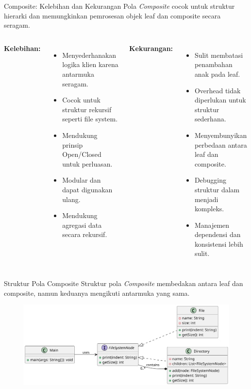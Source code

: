 \documentclass[aspectratio=169, table]{beamer}
\begin{document}
\begin{frame}[fragile]{Composite: Kelebihan dan Kekurangan}
	\vspace{15pt}
	Pola \textit{Composite} cocok untuk struktur hierarki dan memungkinkan pemrosesan objek leaf dan composite secara seragam.
	
	\begin{columns}[T]
		\textbf{Kelebihan:}
		\begin{itemize}
			\item Menyederhanakan logika klien karena antarmuka seragam.
			\item Cocok untuk struktur rekursif seperti file system.
			\item Mendukung prinsip Open/Closed untuk perluasan.
			\item Modular dan dapat digunakan ulang.
			\item Mendukung agregasi data secara rekursif.
		\end{itemize}
		
		\textbf{Kekurangan:}
		\begin{itemize}
			\item Sulit membatasi penambahan anak pada leaf.
			\item Overhead tidak diperlukan untuk struktur sederhana.
			\item Menyembunyikan perbedaan antara leaf dan composite.
			\item Debugging struktur dalam menjadi kompleks.
			\item Manajemen dependensi dan konsistensi lebih sulit.
		\end{itemize}
	\end{columns}
\end{frame}

\begin{frame}[fragile]{Struktur Pola Composite}
	\vspace{20pt}
	Struktur pola \textit{Composite} membedakan antara leaf dan composite, namun keduanya mengikuti antarmuka yang sama.
	
	\begin{figure}[h]
		\centering
		\includegraphics[width=\textwidth]{../../figures/out/composite.png}
	\end{figure}
\end{frame}
\end{document}
